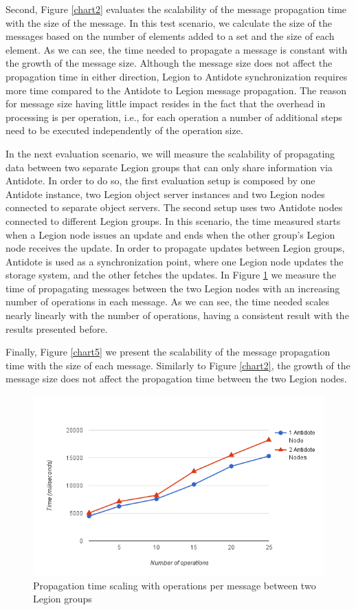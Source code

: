 Second, Figure \ref{chart2} evaluates the scalability of the message propagation time with the size of the message. In this test scenario, we calculate the size of the messages based on the number of elements added to a set and the size of each element. As we can see, the time needed to propagate a message is constant with the growth of the message size. Although the message size does not affect the propagation time in either direction, Legion to Antidote synchronization requires more time compared to the Antidote to Legion message propagation. The reason for message size having little impact resides in the fact that the overhead in processing is per operation, i.e., for each operation a number of additional steps need to be executed independently of the operation size.\par
	In the next evaluation scenario, we will measure the scalability of propagating data between two separate Legion groups that can only share information via Antidote. In order to do so, the first evaluation setup is composed by one Antidote instance, two Legion object server instances and two Legion nodes connected to separate object servers. The second setup uses two Antidote nodes connected to different Legion groups. In this scenario, the time measured starts when a Legion node issues an update and ends when the other group's Legion node receives the update. In order to propagate updates between Legion groups, Antidote is used as a synchronization point, where one Legion node updates the storage system, and the other fetches the updates. In Figure \ref{chart4} we measure the time of propagating messages between the two Legion nodes with an increasing number of operations in each message. As we can see, the time needed scales nearly linearly with the number of operations, having a consistent result with the results presented before.\par
	Finally, Figure \ref{chart5} we present the scalability of the message propagation time with the size of each message. Similarly to Figure \ref{chart2}, the growth of the message size does not affect the propagation time between the two Legion nodes.

\begin{figure}[H]
\centering
\includegraphics[scale=0.7]{files/chart4.png}
\caption{Propagation time scaling with operations per message between two Legion groups}
\label{chart4}
\end{figure}

